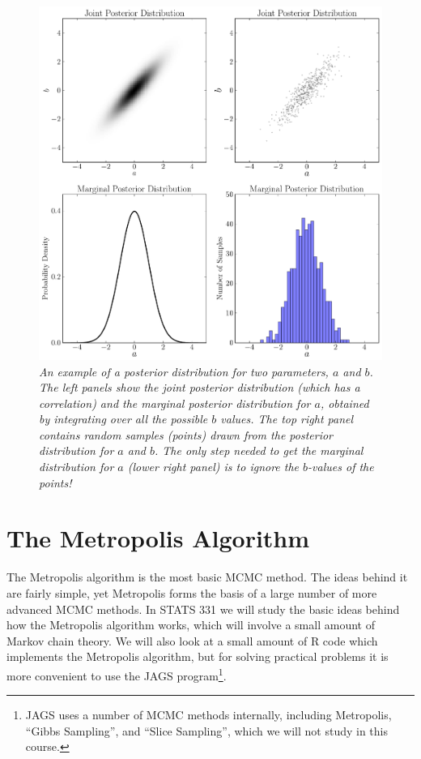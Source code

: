 \begin{figure}[!ht]
\begin{center}
\includegraphics[scale=0.5]{Figures/marginalisation.pdf}
\caption{\it An example of a posterior distribution for two parameters, $a$ and
$b$. The left panels show the joint posterior distribution (which has a
correlation) and the marginal posterior distribution for $a$, obtained by
integrating over all the possible $b$ values. The top right panel contains
random samples
(points) drawn from the posterior distribution for $a$ and $b$.
The only step needed to get the
marginal distribution for $a$ (lower right panel) is to ignore the $b$-values of
the points!
\label{fig:marginalisation}}
\end{center}
\end{figure}


\section{The Metropolis Algorithm}
The Metropolis algorithm is the most basic MCMC method.
The ideas behind it are fairly simple, yet Metropolis forms the basis of a large
number of more advanced MCMC methods. In STATS 331 we will study the basic ideas
behind how the Metropolis algorithm works, which will involve a small amount
of Markov chain theory. We will also look at a small amount of R code
which implements the Metropolis algorithm, but for solving practical problems
it is more convenient to use the JAGS program\footnote{JAGS uses a number
of MCMC methods internally, including Metropolis, ``Gibbs Sampling'', and
``Slice Sampling'', which we will not study in this course.}.

